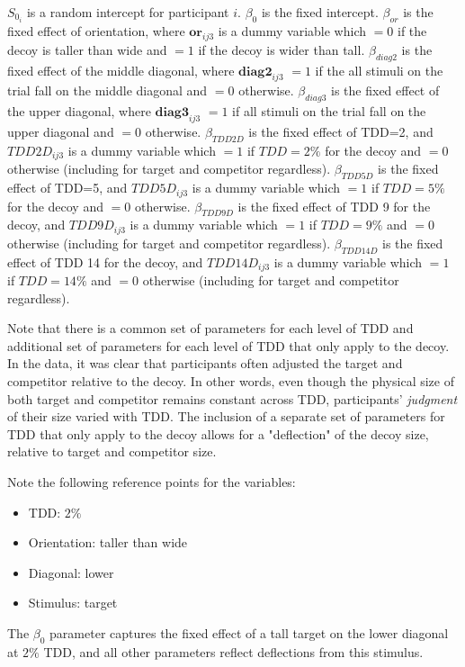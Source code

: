 $S_{0_i}$ is a random intercept for participant $i$. $\beta_{0}$ is the fixed intercept. $\beta_{or}$ is the fixed effect of orientation, where $\bm{or}_{ij3}$ is a dummy variable which $=0$ if the decoy is taller than wide and $=1$ if the decoy is wider than tall. $\beta_{diag2}$ is the fixed effect of the middle diagonal, where $\bm{diag2}_{ij3}$ $=1$ if the all stimuli on the trial fall on the middle diagonal and $=0$ otherwise. $\beta_{diag3}$ is the fixed effect of the upper diagonal, where $\bm{diag3}_{ij3}$ $=1$ if all stimuli on the trial fall on the upper diagonal and $=0$ otherwise. $\beta_{TDD2D}$ is the fixed effect of TDD=2, and $TDD2D_{ij3}$ is a dummy variable which $=1$ if $TDD=2\%$ for the decoy and $=0$ otherwise (including for target and competitor regardless).  $\beta_{TDD5D}$ is the fixed effect of TDD=5, and $TDD5D_{ij3}$ is a dummy variable which $=1$ if $TDD=5\%$ for the decoy and $=0$ otherwise. $\beta_{TDD9D}$ is the fixed effect of TDD 9 for the decoy, and $TDD9D_{ij3}$ is a dummy variable which $=1$ if $TDD=9\%$ and $=0$ otherwise (including for target and competitor regardless). $\beta_{TDD14D}$ is the fixed effect of TDD 14 for the decoy, and $TDD14D_{ij3}$ is a dummy variable which $=1$ if $TDD=14\%$ and $=0$ otherwise (including for target and competitor regardless). 

Note that there is a common set of parameters for each level of TDD and additional set of parameters for each level of TDD that only apply to the decoy. In the data, it was clear that participants often adjusted the target and competitor relative to the decoy. In other words, even though the physical size of both target and competitor remains constant across TDD, participants' \textit{judgment} of their size varied with TDD. The inclusion of a separate set of parameters for TDD that only apply to the decoy allows for a "deflection" of the decoy size, relative to target and competitor size. 

Note the following reference points for the variables:
\begin{itemize}
    \item TDD: $2\%$
    \item Orientation: taller than wide
    \item Diagonal: lower
    \item Stimulus: target
\end{itemize}

The $\beta_{0}$ parameter captures the fixed effect of a tall target on the lower diagonal at $2\%$ TDD, and all other parameters reflect deflections from this stimulus.

